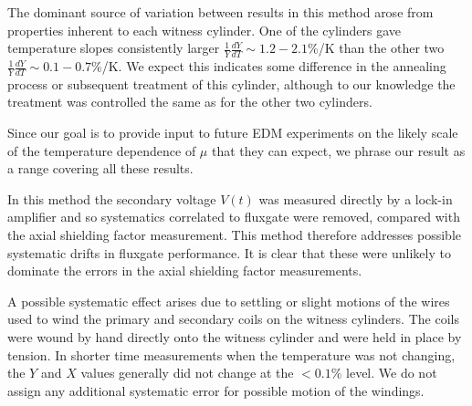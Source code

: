 


The dominant source of variation between results in this method arose
from properties inherent to each witness cylinder.  One of the
cylinders gave temperature slopes consistently larger
$\frac{1}{Y}\frac{dY}{dT}\sim 1.2-2.1$\%/K than the other two
$\frac{1}{Y}\frac{dY}{dT}\sim 0.1-0.7$\%/K.  We expect this indicates
some difference in the annealing process or subsequent treatment of
this cylinder, although to our knowledge the treatment was controlled
the same as for the other two cylinders.

Since our goal is to provide input to future EDM experiments on the
likely scale of the temperature dependence of $\mu$ that they can
expect, we phrase our result as a range covering all these results.

In this method the secondary voltage $V(t)$ was measured directly by a
lock-in amplifier and so systematics correlated to fluxgate were
removed, compared with the axial shielding factor measurement.  This
method therefore addresses possible systematic drifts in fluxgate
performance.  It is clear that these were unlikely to dominate the
errors in the axial shielding factor measurements.


A possible systematic effect arises due to settling or slight motions
of the wires used to wind the primary and secondary coils on the
witness cylinders.  The coils were wound by hand directly onto the
witness cylinder and were held in place by tension.
In shorter time measurements when the temperature was not
changing, the $Y$ and $X$ values generally did not change at the
$<0.1\%$ level.
We do not assign any additional systematic error for possible motion
of the windings.


